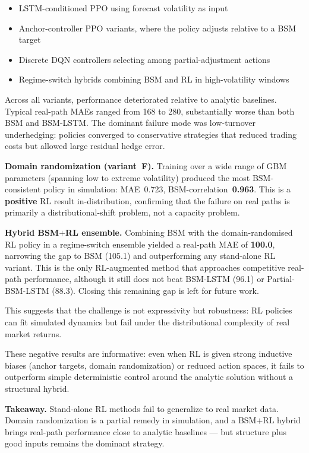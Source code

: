\documentclass[10pt,a4paper]{article}
\begin{document}
\begin{itemize}[leftmargin=*]
  \item LSTM-conditioned PPO using forecast volatility as input
  \item Anchor-controller PPO variants, where the policy adjusts relative to a
        BSM target
  \item Discrete DQN controllers selecting among partial-adjustment actions
  \item Regime-switch hybrids combining BSM and RL in high-volatility windows
\end{itemize}

Across all variants, performance deteriorated relative to analytic baselines.
Typical real-path MAEs ranged from 168 to 280, substantially worse than both
BSM and BSM-LSTM. The dominant failure mode was low-turnover underhedging:
policies converged to conservative strategies that reduced trading costs but
allowed large residual hedge error.

\textbf{Domain randomization (variant~F).}  Training over a wide range of
GBM parameters (spanning low to extreme volatility) produced the most
BSM-consistent policy in simulation: MAE~0.723, BSM-correlation~\textbf{0.963}.
This is a \textbf{positive} RL result in-distribution, confirming that
the failure on real paths is primarily a distributional-shift problem, not
a capacity problem.

\textbf{Hybrid BSM$+$RL ensemble.}  Combining BSM with the domain-randomised
RL policy in a regime-switch ensemble yielded a real-path MAE of
\textbf{100.0}, narrowing the gap to BSM (105.1) and outperforming any
stand-alone RL variant.  This is the only RL-augmented method that
approaches competitive real-path performance, although it still does not
beat BSM-LSTM (96.1) or Partial-BSM-LSTM (88.3).
Closing this remaining gap is left for future work.

This suggests that the challenge is not expressivity but robustness: RL
policies can fit simulated dynamics but fail under the distributional
complexity of real market returns.

These negative results are informative: even when RL is given strong inductive
biases (anchor targets, domain randomization) or reduced action spaces, it
fails to outperform simple deterministic control around the analytic solution
without a structural hybrid.

\textbf{Takeaway.} Stand-alone RL methods fail to generalize to real market
data.  Domain randomization is a partial remedy in simulation, and a
BSM$+$RL hybrid brings real-path performance close to analytic baselines ---
but structure plus good inputs remains the dominant strategy.
\end{document}
